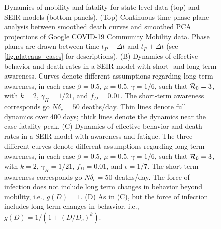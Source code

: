 \begin{figure}
\begin{center}
\caption{Dynamics of mobility and fatality for state-level
data (top) and SEIR models (bottom panels).
(Top) Continuous-time phase plane analysis between smoothed death curves and smoothed PCA projections of Google COVID-19 Community Mobility data.
Phase planes are drawn between time $t_P - \Delta t$ and $t_P + \Delta t$ (see \ref{fig.plateaus_cases} for descriptions).
(B)
Dynamics of effective behavior and death rates
in a SEIR model with short- and long-term awareness. 
Curves denote different assumptions regarding long-term awareness,
in each case $\beta=0.5$, $\mu=0.5$, $\gamma=1/6$, such that ${\cal{R}}_0=3$,
with $k=2$, $\gamma_H=1/21$, and $f_D=0.01$.  The short-term awareness
corresponds go $N\delta_c=50$ deaths/day. Thin lines denote
full dynamics over 400 days; thick lines denote the dynamics
near the case fatality peak.
(C) Dynamics of effective behavior and death rates
in a SEIR model with awareness and fatigue. The three
different curves denote different assumptions regarding long-term awareness,
in each case $\beta=0.5$, $\mu=0.5$, $\gamma=1/6$, such that ${\cal{R}}_0=3$,
with $k=2$, $\gamma_H=1/21$, $f_D=0.01$, and $\epsilon=1/7$.  
The short-term awareness
corresponds go $N\delta_c=50$ deaths/day. 
The force of infection does not include long term changes in behavior
beyond mobility, i.e., $g(D)=1$.
(D) As in (C), but the force
of infection includes long-term changes in behavior, i.e., 
$g(D)=1/\left(1+(D/D_c)^k\right)$.
\label{fig.phase_real_theory}}
\end{center}
\end{figure}

